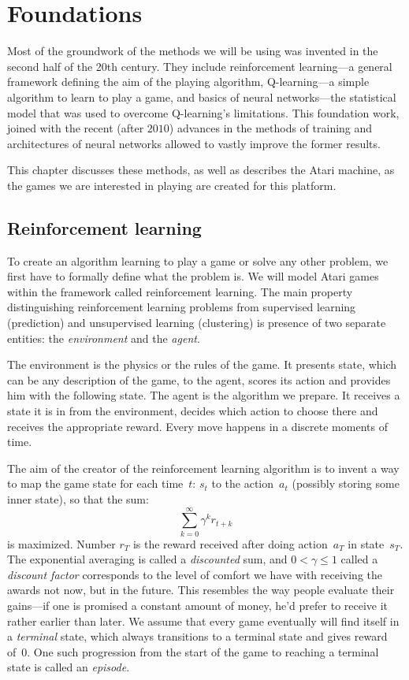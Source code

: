 \chapter{Foundations}\label{foundations}
Most of the groundwork of the methods we will be using was invented in the second half of the 20th century. They include reinforcement learning---a general framework defining the aim of the playing algorithm, Q-learning---a simple algorithm to learn to play a game, and basics of neural networks---the statistical model that was used to overcome Q-learning's limitations.
This foundation work, joined with the recent (after $2010$) advances in the methods of training and architectures of neural networks allowed to vastly improve the former results.

This chapter discusses these methods, as well as describes the Atari machine, as the games we are interested in playing are created for this platform.

\section{Reinforcement learning}
To create an algorithm learning to play a game or solve any other problem, we first have to formally define what the problem is. We will model Atari games within the framework called reinforcement learning. The main property distinguishing reinforcement learning problems from supervised learning (prediction) and unsupervised learning (clustering) is presence of two separate entities: the \emph{environment} and the \emph{agent}.

The environment is the physics or the rules of the game. It presents state, which can be any description of the game, to the agent, scores its action and provides him with the following state.
The agent is the algorithm we prepare. It receives a state it is in from the environment, decides which action to choose there and receives the appropriate reward. Every move happens in a discrete moments of time.

The aim of the creator of the reinforcement learning algorithm is to invent a way to map the game state for each time~$t$: $s_t$ to the action~$a_t$ (possibly storing some inner state), so that the sum:
\begin{equation} \label{discounted-reward}
\sum_{k=0}^{\infty} \gamma^k r_{t + k}
\end{equation}
is maximized. Number $r_T$ is the reward received after doing action~$a_T$ in state~$s_T$. The exponential averaging is called a \emph{discounted} sum, and $0 < \gamma \le 1$ called a \emph{discount factor} corresponds to the level of comfort we have with receiving the awards not now, but in the future. This resembles the way people evaluate their gains---if one is promised a constant amount of money, he'd prefer to receive it rather earlier than later. We assume that every game eventually will find itself in a \emph{terminal} state, which always transitions to a terminal state and gives reward of~$0$. One such progression from the start of the game to reaching a terminal state is called an \emph{episode}.

